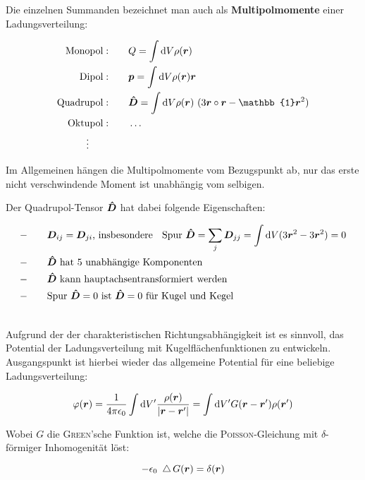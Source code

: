 Die einzelnen Summanden bezeichnet man auch als \textbf{Multipolmomente} einer Ladungsverteilung:

\begin{align*}
\mathrm{Monopol:}& \qquad Q = \int\d V \rho(\vec{r})\\
\mathrm{Dipol:}& \qquad \vec{p} = \int\d V \rho(\vec{r})\vec{r}\\
\mathrm{Quadrupol:}& \qquad \tens{D} = \int\d V \rho(\vec{r}) \ (3\vec{r}\circ\vec{r}-\mathbb{1}\vec{r}^2)\\
\mathrm{Oktupol:}& \qquad \dotsc\\
\vdots \qquad &
\end{align*}

Im Allgemeinen hängen die Multipolmomente vom Bezugspunkt ab, nur das erste nicht verschwindende Moment ist unabhängig vom selbigen.

Der Quadrupol-Tensor $\bm{\hat{D}}$ hat dabei folgende Eigenschaften:

\begin{align*}
- \qquad & \bm{D}_{ij} = \bm{D}_{ji}\text{, insbesondere } \; \text{ Spur } \bm{\hat{D}} = \sum_j \bm{D}_{jj} = \int\mathrm{d} V (3\bm{r}^2 - 3\bm{r}^2)=0 \\
- \qquad & \bm{\hat{D}} \text{ hat 5 unabhängige Komponenten}\\
- \qquad & \bm{\hat{D}} \text{ kann hauptachsentransformiert werden}\\
- \qquad & \text{Spur } \bm{\hat{D}} =0 \text{ ist } \bm{\hat{D}}=0 \text{ für Kugel und Kegel}
\end{align*}

\ \\

Aufgrund der der charakteristischen Richtungsabhängigkeit ist es sinnvoll, das Potential der Ladungsverteilung mit Kugelflächenfunktionen zu entwickeln. Ausgangspunkt ist hierbei wieder das allgemeine Potential für eine beliebige Ladungsverteilung: 

\begin{equation*}
\varphi(\bm{r}) = \frac{1}{4\pi\epsilon_0}\int\mathrm{d} V' \frac{\rho(\bm{r})}{|\bm{r}-\bm{r}'|} = \int\mathrm{d} V' G(\bm{r}-\bm{r}')\rho(\bm{r}')
\end{equation*}

Wobei $G$ die \textsc{Green}'sche Funktion ist, welche die \textsc{Poisson}-Gleichung mit $\delta$-förmiger Inhomogenität löst:

\begin{equation*}
-\epsilon_0 \ \mathop{{}\bigtriangleup}\nolimits G(\bm{r}) = \delta(\bm{r})
\end{equation*}

